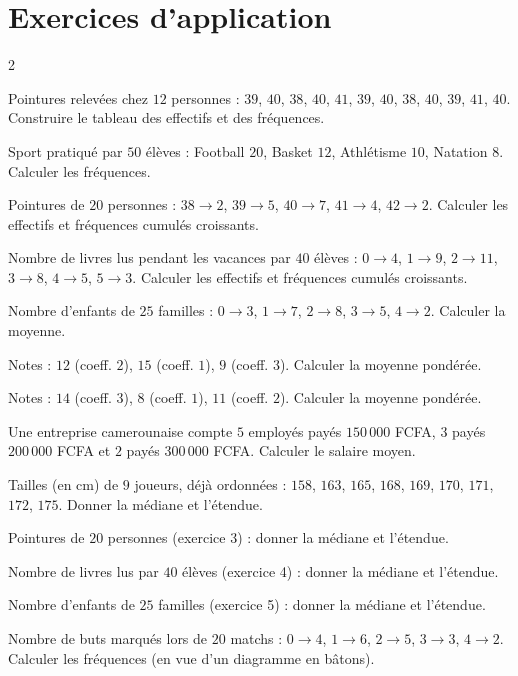 \section{Exercices d'application}
\begin{multicols}{2}

\exo{} Pointures relevées chez $12$ personnes : $39$, $40$, $38$, $40$, $41$, $39$,
$40$, $38$, $40$, $39$, $41$, $40$. Construire le tableau des effectifs et des fréquences.

\exo{} Sport pratiqué par $50$ élèves : Football $20$, Basket $12$, Athlétisme $10$,
Natation $8$. Calculer les fréquences.

\exo{} Pointures de $20$ personnes : $38\to2$, $39\to5$, $40\to7$, $41\to4$,
$42\to2$. Calculer les effectifs et fréquences cumulés croissants.

\exo{} Nombre de livres lus pendant les vacances par $40$ élèves : $0\to4$,
$1\to9$, $2\to11$, $3\to8$, $4\to5$, $5\to3$. Calculer les effectifs et fréquences
cumulés croissants.

\exo{} Nombre d'enfants de $25$ familles : $0\to3$, $1\to7$, $2\to8$, $3\to5$,
$4\to2$. Calculer la moyenne.

\exo{} Notes : $12$ (coeff. $2$), $15$ (coeff. $1$), $9$ (coeff. $3$). Calculer la
moyenne pondérée.

\exo{} Notes : $14$ (coeff. $3$), $8$ (coeff. $1$), $11$ (coeff. $2$). Calculer la
moyenne pondérée.

\exo{} Une entreprise camerounaise compte $5$ employés payés $150\,000$ FCFA, $3$
payés $200\,000$ FCFA et $2$ payés $300\,000$ FCFA. Calculer le salaire moyen.

\exo{} Tailles (en cm) de $9$ joueurs, déjà ordonnées :
$158$, $163$, $165$, $168$, $169$, $170$, $171$, $172$, $175$. Donner la médiane et
l'étendue.

\exo{} Pointures de $20$ personnes (exercice 3) : donner la médiane et
l'étendue.

\exo{} Nombre de livres lus par $40$ élèves (exercice 4) : donner la médiane et
l'étendue.

\exo{} Nombre d'enfants de $25$ familles (exercice 5) : donner la médiane et
l'étendue.

\exo{} Nombre de buts marqués lors de $20$ matchs : $0\to4$, $1\to6$, $2\to5$,
$3\to3$, $4\to2$. Calculer les fréquences (en vue d'un diagramme en bâtons).


\end{multicols}
